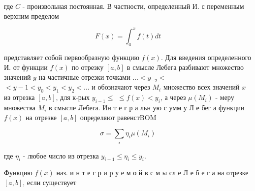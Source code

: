 \documentclass[10pt]{article}
\begin{document}
где $C$ - произвольная постоянная. В частности, определенный И. с переменным верхним пределом



\[

F(x)=\int_{a}^{x} f(t) d t

\]



представляет собой первообразную функцию $f(x)$. Для введения определенного И. от функции $f(x)$ по отрезку $[a, b]$ в смысле Лебега разбивают множество значений $y$ на частичные отрезки точками $\ldots<y_{-2}<$ $<y-1<y_{0}<y_{1}<y_{2}<\ldots$ и обозначают через $M_{i}$ множество всех значений $x$ из отрезка $[a, b]$, для к-рых $y_{i-1} \leqslant$ $\leqslant f(x)<y_{i}$, а через $\mu\left(M_{i}\right)$ - меру множества $M_{i}$ в смысле Лебега. Ин т е г р а льн ую с умм у Л е бег а функции $f(x)$ на отрезке $[a, b]$ определяют равенстBOM



\[

\sigma=\sum_{i} \eta_{i} \mu\left(M_{i}\right)

\]



где $\eta_{i}$ - любое число из отрезка $y_{i-1} \leqslant \eta_{i} \leqslant y_{i}$.



Функцию $f(x)$ наз. и н т е г р и р у е м о й в с м ы сл е Л е б е г а на отрезке $[a, b]$, если существует
\end{document}
